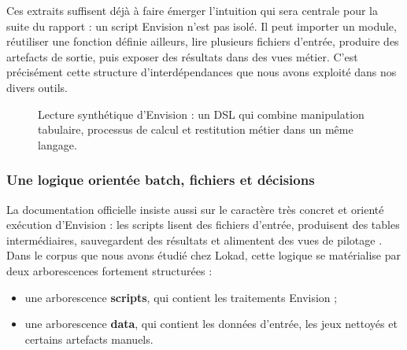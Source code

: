 \medskip
Ces extraits suffisent déjà à faire émerger l'intuition qui sera centrale pour la suite du rapport : un script Envision n'est pas isolé. Il peut importer un module, réutiliser une fonction définie ailleurs, lire plusieurs fichiers d'entrée, produire des artefacts de sortie, puis exposer des résultats dans des vues métier. C'est précisément cette structure d'interdépendances que nous avons exploité dans nos divers outils.

\begin{figure}[H]
\begin{center}
\end{center}
\caption{Lecture synthétique d'Envision : un DSL qui combine manipulation tabulaire, processus de calcul et restitution métier dans un même langage.}
\end{figure}

\subsubsection{Une logique orientée batch, fichiers et décisions}

La documentation officielle insiste aussi sur le caractère très concret et orienté exécution d'Envision : les scripts lisent des fichiers d'entrée, produisent des tables intermédiaires, sauvegardent des résultats et alimentent des vues de pilotage \cite{LokadEnvision}. Dans le corpus que nous avons étudié chez Lokad, cette logique se matérialise par deux arborescences fortement structurées :
\begin{itemize}
    \item une arborescence \textbf{scripts}, qui contient les traitements Envision ;
    \item une arborescence \textbf{data}, qui contient les données d'entrée, les jeux nettoyés et certains artefacts manuels.
\end{itemize}

